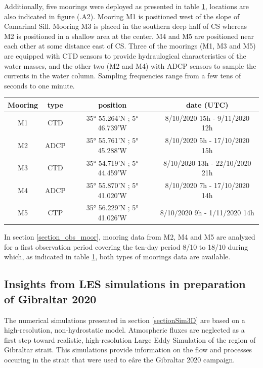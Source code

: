 Additionally, five moorings were deployed as presented in table \ref{tab_moor}, locations are also indicated in figure (.A2). Mooring M1 is positioned west of the slope of Camarinal Sill. Mooring M3 is placed in the southern deep half of CS whereas M2 is positioned in a shallow area at the center. M4 and M5 are positioned near each other at some distance east of CS. Three of the moorings (M1, M3 and M5) are equipped with CTD sensors to provide hydraulogical characteristics of the water masses, and the other two (M2 and M4) with ADCP sensors to sample the currents in the water column. Sampling frequencies range from a few tens of seconds to one minute.

\begin{table}[!h]
        \centering
        \begin{tabular}{|c|c|c|c|}
                \hline
                Mooring & type & position & date (UTC)\\ 
                 \hline
                M1 & CTD & 35° 55.264'N ; 5° 46.739'W & 8/10/2020 15h - 9/11/2020 12h\\
                M2 & ADCP & 35° 55.761'N ; 5° 45.288'W & 8/10/2020 5h - 17/10/2020 15h\\
                M3 & CTD & 35° 54.719'N ; 5° 44.459'W & 8/10/2020 13h - 22/10/2020 21h\\
                M4 & ADCP & 35° 55.870'N ; 5° 41.020'W & 8/10/2020 7h - 17/10/2020 14h\\
                M5 & CTP & 35° 56.229'N ; 5° 41.026'W & 8/10/2020 9h - 1/11/2020 14h\\
                \hline
        \end{tabular}
        \label{tab_moor}
\end{table}
In section \ref{section_obs_moor}, mooring data from M2, M4 and M5 are analyzed for a first observation period covering the ten-day period 8/10 to 18/10 during which, as indicated in table \ref{tab_moor}, both types of moorings data are available.


\subsection{Insights from LES simulations in preparation of Gibraltar 2020}

The numerical simulations presented in section \ref{sectionSim3D} are based on a high-resolution, non-hydrostatic model. Atmospheric fluxes are neglected as a first step toward realistic, high-resolution Large Eddy Simulation of the region of Gibraltar strait. This simulations provide information on the flow and processes occuring in the strait that were used to eâre the Gibraltar 2020 campaign.

